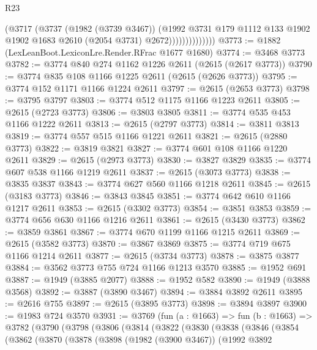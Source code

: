 \begin{lexlean}{R23}
\begin{coremodule}
                          (@3717
                            (@3737
                              (@1982 (@3739 @3467))
                              (@1992
                                @3731
                                @179
                                @1112
                                @133
                                @1902
                                @1902
                                @1683
                                @2610
                                (@2054 @3731)
                                @2672))))))))))))))
@3773 := @1882 (LexLeanBoot.LexiconLre.Render.RFrac @1677 @1680)
@3774 := @3468 @3773
@3782 := @3774 @840 @274 @1162 @1226 @2611 (@2615 (@2617 @3773))
@3790 := @3774 @835 @108 @1166 @1225 @2611 (@2615 (@2626 @3773))
@3795 := @3774 @152 @1171 @1166 @1224 @2611
@3797 := @2615 (@2653 @3773)
@3798 := @3795 @3797
@3803 := @3774 @512 @1175 @1166 @1223 @2611
@3805 := @2615 (@2723 @3773)
@3806 := @3803 @3805
@3811 := @3774 @535 @453 @1166 @1222 @2611
@3813 := @2615 (@2797 @3773)
@3814 := @3811 @3813
@3819 := @3774 @557 @515 @1166 @1221 @2611
@3821 := @2615 (@2880 @3773)
@3822 := @3819 @3821
@3827 := @3774 @601 @108 @1166 @1220 @2611
@3829 := @2615 (@2973 @3773)
@3830 := @3827 @3829
@3835 := @3774 @607 @538 @1166 @1219 @2611
@3837 := @2615 (@3073 @3773)
@3838 := @3835 @3837
@3843 := @3774 @627 @560 @1166 @1218 @2611
@3845 := @2615 (@3183 @3773)
@3846 := @3843 @3845
@3851 := @3774 @642 @610 @1166 @1217 @2611
@3853 := @2615 (@3302 @3773)
@3854 := @3851 @3853
@3859 := @3774 @656 @630 @1166 @1216 @2611
@3861 := @2615 (@3430 @3773)
@3862 := @3859 @3861
@3867 := @3774 @670 @1199 @1166 @1215 @2611
@3869 := @2615 (@3582 @3773)
@3870 := @3867 @3869
@3875 := @3774 @719 @675 @1166 @1214 @2611
@3877 := @2615 (@3734 @3773)
@3878 := @3875 @3877
@3884 := @3562 @3773 @755 @724 @1166 @1213 @3570
@3885 := @1952 @691
@3887 := @1949 (@3885 @2077)
@3888 := @1952 @582
@3890 := @1949 (@3888 @3568)
@3892 := @3887 (@3890 @3467)
@3894 := @3884 @3892 @2611
@3895 := @2616 @755
@3897 := @2615 (@3895 @3773)
@3898 := @3894 @3897
@3900 := @1983 @724 @3570
@3931 := @3769
    (fun (a : @1663) =>
    fun (b : @1663) =>
    @3782
      (@3790
        (@3798
          (@3806
            (@3814
              (@3822
                (@3830
                  (@3838
                    (@3846
                      (@3854
                        (@3862
                          (@3870
                            (@3878
                              (@3898
                                (@1982 (@3900 @3467))
                                (@1992
                                  @3892

\end{coremodule}
\end{lexlean}

